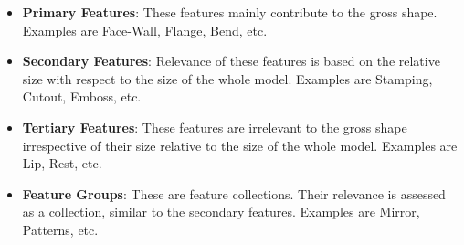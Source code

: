 \begin{itemize}
[noitemsep,topsep=2pt,parsep=2pt,partopsep=2pt, leftmargin=*]
\item \textbf{Primary Features}: These features mainly contribute to the gross shape. Examples are  Face-Wall, Flange, Bend, etc.
\item \textbf{Secondary Features}: Relevance of these features is based on the relative size with respect to the size of the whole model. Examples are Stamping, Cutout, Emboss, etc.
	
\item \textbf{Tertiary Features}: These features are irrelevant to the gross shape irrespective of their size relative to the size of the whole model. Examples are Lip, Rest, etc.
	
		
\item \textbf{Feature Groups}: These are feature collections. Their relevance is assessed as a collection, similar to the secondary features. Examples are Mirror, Patterns, etc.
\end{itemize}


